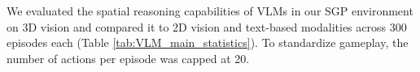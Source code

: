 We evaluated the spatial reasoning capabilities of VLMs in our SGP environment on 3D vision and compared it to 2D vision and text-based modalities across 300 episodes each (Table \ref{tab:VLM_main_statistics}). To standardize gameplay, the number of actions per episode was capped at 20.